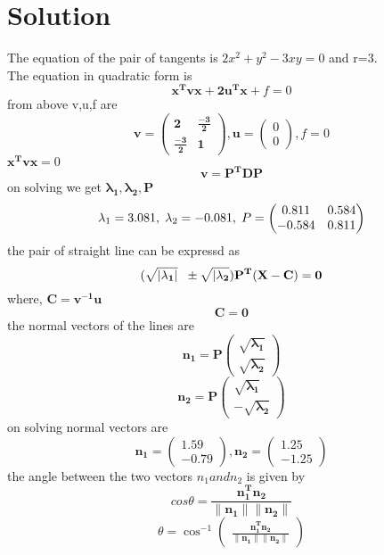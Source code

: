 \documentclass[journal,10pt,twocolumn]{article}
\let\vec\mathbf
\newcommand{\myvec}[1]{\ensuremath{\begin{pmatrix}#1\end{pmatrix}}}
\begin{document}
\section*{\large Solution}
The equation of the pair of tangents is $ 2x^2+y^2-3xy=0 $ and r=3.
\\The equation in quadratic form is 
 \begin{equation*}
   \vec{  x^Tvx + 2u^Tx}+f=0
 \end{equation*}
 from above v,u,f are
 \begin{equation*}
 	\vec{v= \begin{pmatrix}
 				2&\frac{-3}{2}\\\frac{-3}{2}&1
 			 \end{pmatrix},
 			 u }= \myvec{0\\0},f=0
 \end{equation*}
 \hspace{40mm}$ \vec{x^Tvx} = 0 $\\
 \begin{equation*}
 \vec{v=P^TDP}
 \end{equation*}
 on solving we get $ \vec{\lambda_1,\lambda_2, P} $ 
\begin{equation*}
\lambda_1 = 3.081,\hspace{1mm} \lambda_2 = -0.081,\hspace{1mm}P=\begin{pmatrix}
0.811&0.584\\-0.584&0.811
\end{pmatrix}
 \end{equation*}
 the pair of straight line can be expressd as
 \begin{equation*}
\vec{(\sqrt{|\lambda_1|}\hspace{2mm} \pm \sqrt{|\lambda_2})P^T(X-C)=0}  
 \end{equation*}
 where,
 \hspace{30mm}$ \vec{C=v^{-1}u} $\\\begin{equation*}
 \vec{C = 0 } 
 \end{equation*} 
the normal vectors of the lines are
\begin{equation*}
\vec{n_1 = P\myvec{\sqrt{\lambda_1}\\\sqrt{\lambda_2}}}
\end{equation*} 
\begin{equation*}
\vec{n_2 = P\myvec{\sqrt{\lambda_1}\\-\sqrt{\lambda_2}}}
\end{equation*} 
 on solving normal vectors are
 \begin{equation*}
    \vec{n_1} = \myvec{1.59\\-0.79},
     \vec{n_2} = \myvec{1.25\\-1.25}
 \end{equation*}
 the angle between the two vectors $ n_1 and n_2 $ is given by 
 \begin{equation*}
     cos\theta = \vec{\frac{n_1^Tn_2}{\|n_1\|\|n_2\|}}
 \end{equation*}
 \begin{equation*}
      \theta = \cos^{-1}\myvec{\vec{\frac{n_1^Tn_2}{\|n_1\|\|n_2\|}}}
 \end{equation*}
 
\end{document}
